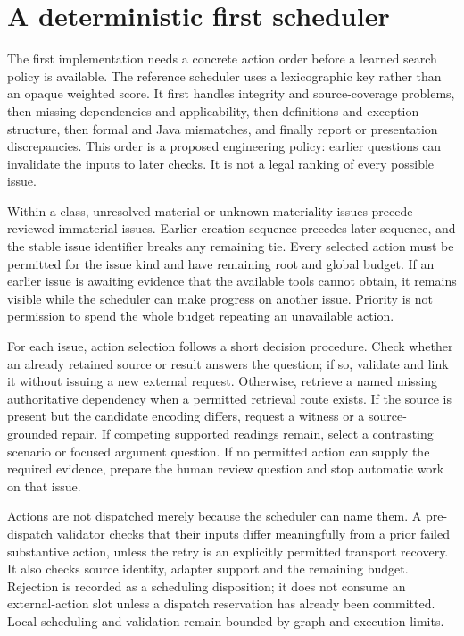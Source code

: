 \section{A deterministic first scheduler}
\label{merge:M06:14}


The first implementation needs a concrete action order before a learned search
policy is available. The reference scheduler uses a lexicographic key rather
than an opaque weighted score. It first handles integrity and source-coverage
problems, then missing dependencies and applicability, then definitions and
exception structure, then formal and Java mismatches, and finally report or
presentation discrepancies. This order is a proposed engineering policy: earlier
questions can invalidate the inputs to later checks. It is not a legal ranking
of every possible issue.

Within a class, unresolved material or unknown-materiality issues precede reviewed
immaterial issues. Earlier creation sequence precedes later sequence, and the
stable issue identifier breaks any remaining tie. Every selected action must be
permitted for the issue kind and have remaining root and global budget. If an
earlier issue is awaiting evidence that the available tools cannot obtain, it
remains visible while the scheduler can make progress on another issue. Priority
is not permission to spend the whole budget repeating an unavailable action.

For each issue, action selection follows a short decision procedure. Check whether
an already retained source or result answers the question; if so, validate and
link it without issuing a new external request. Otherwise, retrieve a named
missing authoritative dependency when a permitted retrieval route exists. If the
source is present but the candidate encoding differs, request a witness or a
source-grounded repair. If competing supported readings remain, select a
contrasting scenario or focused argument question. If no permitted action can
supply the required evidence, prepare the human review question and stop automatic
work on that issue.


Actions are not dispatched merely because the scheduler can name them. A
pre-dispatch validator checks that their inputs differ meaningfully from a prior
failed substantive action, unless the retry is an explicitly permitted transport
recovery. It also checks source identity, adapter support and the remaining
budget. Rejection is recorded as a scheduling disposition; it does not consume
an external-action slot unless a dispatch reservation has already been committed.
Local scheduling and validation remain bounded by graph and execution limits.

